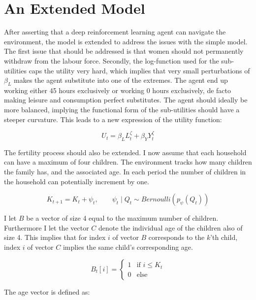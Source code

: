 \section{An Extended Model}

After asserting that a deep reinforcement learning agent can navigate the environment, the model is extended to address the issues with the simple model. The first issue that should be addressed is that women should not permanently withdraw from the labour force. Secondly, the log-function used for the sub-utilities caps the utility very hard, which implies that very small perturbations of $\beta_L$ makes the agent substitute into one of the extremes. The agent end up working either 45 hours exclusively or working 0 hours exclusively, de facto making leisure and consumption perfect substitutes. The agent should ideally be more balanced, implying the functional form of the sub-utilities should have a steeper curvature. This leads to a new expression of the utility function:

\begin{equation}
    U_t = \beta_L L_{t}^\zeta + \beta_Y Y_t^{\zeta}
\end{equation}

The fertility process should also be extended. I now assume that each household can have a maximum of four children. The environment tracks how many children the family has, and the associated age. In each period the number of children in the household can potentially increment by one.

\begin{equation}
    K_{t+1} = K_t+ \psi_t, \qquad \psi_t \mid Q_t \sim Bernoulli (p_\psi(Q_t))
\end{equation}

I let $B$ be a vector of size 4 equal to the maximum number of children. Furthermore I let the vector $C$ denote the individual age of the children also of size 4. This implies that for index $i$ of vector $B$ corresponds to the $k$'th child, index $i$ of vector $C$ implies the same child's corresponding age.

\begin{equation}
    B_t[i]  = \begin{cases}
        1 & \text{if }  i \leq K_t \\
        0 & \text{else}
    \end{cases}
\end{equation}

The age vector is defined as:

